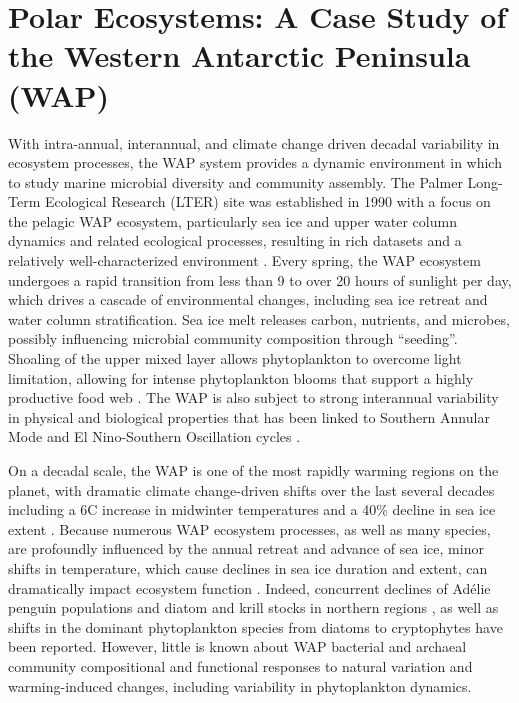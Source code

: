 \section{Polar Ecosystems: A Case Study of the Western Antarctic Peninsula (WAP)}

With intra-annual, interannual, and climate change driven decadal variability in ecosystem processes, the WAP system provides a dynamic environment in which to study marine microbial diversity and community assembly. The Palmer Long-Term Ecological Research (LTER) site was established in 1990 with a focus on the pelagic WAP ecosystem, particularly sea ice and upper water column dynamics and related ecological processes, resulting in rich datasets and a relatively well-characterized environment \citep{smithLTER1995}. Every spring, the WAP ecosystem undergoes a rapid transition from less than 9 to over 20 hours of sunlight per day, which drives a cascade of environmental changes, including sea ice retreat and water column stratification. Sea ice melt releases carbon, nutrients, and microbes, possibly influencing microbial community composition through ``seeding''.  Shoaling of the upper mixed layer allows phytoplankton to overcome light limitation, allowing for intense phytoplankton blooms that support a highly productive food web \citep{Venables2013-me,Smetacek2005-tz}. The WAP is also subject to strong interannual variability in physical and biological properties that has been linked to Southern Annular Mode and El Nino-Southern Oscillation cycles \citep{saba2014winter}.
 
On a decadal scale, the WAP is one of the most rapidly warming regions on the planet, with dramatic climate change-driven shifts over the last several decades including a 6\textdegree C increase in midwinter temperatures and a 40\% decline in sea ice extent \citep{dcddghmmmms12,Schofield2010-jj,Stammerjohn2008-nj,Steig2009-nb}. Because numerous WAP ecosystem processes, as well as many species, are profoundly influenced by the annual retreat and advance of sea ice, minor shifts in temperature, which cause declines in sea ice duration and extent, can dramatically impact ecosystem function \citep{Moline2008-pc}. Indeed, concurrent declines of Ad\'{e}lie penguin populations \citep{Ducklow2007-ns,Fraser1986-ps} and diatom and krill stocks in northern regions \citep{aspr04,mddfmss09}, as well as shifts in the dominant phytoplankton species from diatoms to cryptophytes \citep{Moline2004-ma} have been reported. However, little is known about WAP bacterial and archaeal community compositional and functional responses to natural variation and warming-induced changes, including variability in phytoplankton dynamics.
 
